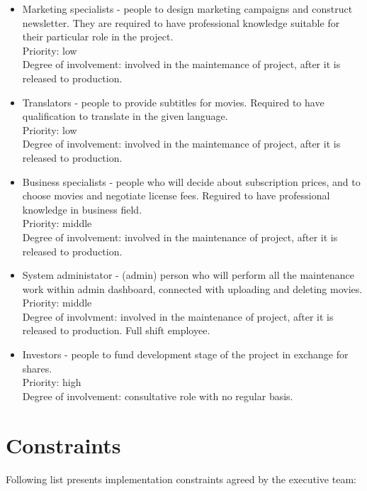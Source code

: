 \documentclass{scrreprt}
\begin{document}
\begin{itemize}
\item Marketing specialists - people to design marketing campaigns and construct newsletter. They are required to have professional knowledge suitable for their particular role in the project.
\\Priority: low
\\Degree of involvement: involved in the maintemance of project, after it is released to production.

\item Translators - people to provide subtitles for movies. Required to have qualification to translate in the given language.
\\Priority: low
\\Degree of involvement: involved in the maintemance of project, after it is released to production.

\item Business specialists - people who will decide about subscription prices, and to choose movies and negotiate license fees. Reguired to have professional knowledge in business field.
\\Priority: middle
\\Degree of involvement: involved in the maintenance of project, after it is released to production.

\item System administator - (admin) person who will perform all the maintenance work within admin dashboard, connected with uploading and deleting movies.
\\Priority: middle
\\Degree of involvment: involved in the maintenance of project, after it is released to production. Full shift employee. 

\item Investors - people to fund development stage of the project in exchange for shares.
\\Priority: high
\\Degree of involvement: consultative role with no regular basis.
\end{itemize}

\section{Constraints}

Following list presents implementation constraints agreed by the executive team:
\end{document}
